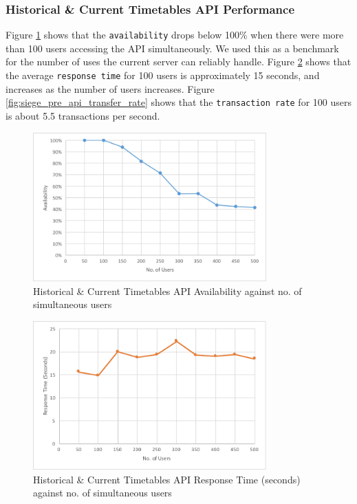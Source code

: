 \subsubsection{Historical \& Current Timetables API Performance}

\par Figure \ref{fig:siege_pre_api_availability} shows that the \texttt{availability} drops below 100\% when there were more than 100 users accessing the API simultaneously. We used this as a benchmark for the number of uses the current server can reliably handle. Figure \ref{fig:siege_pre_api_response_time} shows that the average \texttt{response time} for 100 users is approximately 15 seconds, and increases as the number of users increases. Figure \ref{fig:siege_pre_api_transfer_rate} shows that the \texttt{transaction rate} for 100 users is about 5.5 transactions per second.


\begin{figure}
\centering
\includegraphics[width=0.8\textwidth]{figures/siege_predictions_api_availability_against_users.pdf}
\caption{\label{fig:siege_pre_api_availability} Historical \& Current Timetables API Availability against no. of simultaneous users}
\end{figure}

\begin{figure}
\centering
\includegraphics[width=0.8\textwidth]{figures/siege_predictions_api_response_time_against_users.pdf}
\caption{\label{fig:siege_pre_api_response_time} Historical \& Current Timetables API Response Time (seconds) against no. of simultaneous users}
\end{figure}

